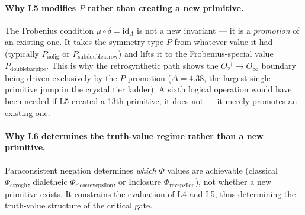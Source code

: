 \documentclass[12pt,a4paper]{article}
\begin{document}
\paragraph{Why L5 modifies $P$ rather than creating a new primitive.}
The Frobenius condition $\mu \circ \delta = \text{id}_A$ is not a new invariant --- it is a \emph{promotion} of an existing one. It takes the symmetry type $P$ from whatever value it had (typically $P_{\text{aolig}}$ or $P_{\text{subdoublearrow}}$) and lifts it to the Frobenius-special value $P_{\text{doublebarpipe}}$. This is why the retrosynthetic path shows the $O₂^\dagger \to O_\infty$ boundary being driven exclusively by the $P$ promotion ($\Delta = 4.38$, the largest single-primitive jump in the crystal tier ladder). A sixth logical operation would have been needed if L5 created a 13th primitive; it does not — it merely promotes an existing one.

\paragraph{Why L6 determines the truth-value regime rather than a new primitive.}
Paraconsistent negation determines \emph{which} $\Phi$ values are achievable (classical $\Phi_{\text{ctyogh}}$, dialetheic $\Phi_{\text{closerevepsilon}}$, or Inclosure $\Phi_{\text{revepsilon}}$), not whether a new primitive exists. It constrains the evaluation of L4 and L5, thus determining the truth-value structure of the critical gate.
\end{document}
